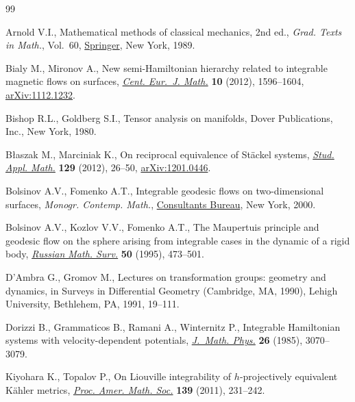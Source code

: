 \documentclass[pdftex]{sigma}
\numberwithin{equation}{section}
\begin{document}
\begin{thebibliography}{99}
\footnotesize\itemsep=0pt

Arnold V.I., Mathematical methods of classical mechanics, 2nd ed., \textit{Grad. Texts
  in Math.}, Vol.~60, \href{https://doi.org/10.1007/978-1-4757-2063-1}{Springer}, New York, 1989.

Bialy M., Mironov A., New semi-{H}amiltonian hierarchy related to integrable
  magnetic flows on surfaces, \href{https://doi.org/10.2478/s11533-012-0045-3}{\textit{Cent. Eur.~J. Math.}} \textbf{10} (2012),
  1596--1604, \href{https://arxiv.org/abs/1112.1232}{arXiv:1112.1232}.

Bishop R.L., Goldberg S.I., Tensor analysis on manifolds, Dover Publications,
  Inc., New York, 1980.

B{\l}aszak M., Marciniak K., On reciprocal equivalence of {S}t\"ackel systems,
  \href{https://doi.org/10.1111/j.1467-9590.2011.00544.x}{\textit{Stud. Appl. Math.}} \textbf{129} (2012), 26--50, \href{https://arxiv.org/abs/1201.0446}{arXiv:1201.0446}.

Bolsinov A.V., Fomenko A.T., Integrable geodesic flows on two-dimensional
  surfaces, \textit{Monogr. Contemp. Math.}, \href{https://doi.org/10.1007/978-1-4615-4307-7}{Consultants Bureau}, New York, 2000.

Bolsinov A.V., Kozlov V.V., Fomenko A.T., The Maupertuis principle and geodesic
  flow on the sphere arising from integrable cases in the dynamic of a rigid
  body, \href{https://doi.org/10.1070/RM1995v050n03ABEH002100}{\textit{Russian Math. Surv.}} \textbf{50} (1995), 473--501.

D'Ambra G., Gromov M., Lectures on transformation groups: geometry and
  dynamics, in Surveys in Differential Geometry ({C}ambridge, {MA}, 1990),
  Lehigh University, Bethlehem, PA, 1991, 19--111.

Dorizzi B., Grammaticos B., Ramani A., Winternitz P., Integrable {H}amiltonian
  systems with velocity-dependent potentials, \href{https://doi.org/10.1063/1.526685}{\textit{J.~Math. Phys.}}
  \textbf{26} (1985), 3070--3079.

Kiyohara K., Topalov P., On {L}iouville integrability of {$h$}-projectively
  equivalent {K}\"ahler metrics, \href{https://doi.org/10.1090/S0002-9939-2010-10576-2}{\textit{Proc. Amer. Math. Soc.}} \textbf{139}
  (2011), 231--242.


\end{thebibliography}
\end{document}
